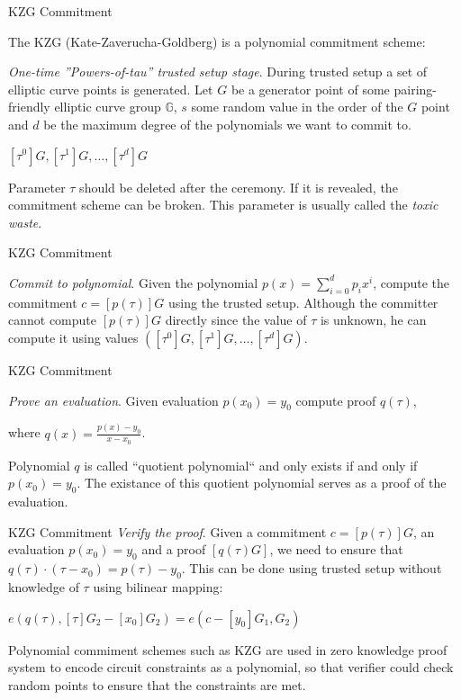 \documentclass{zkdl-presentation-template}
\begin{document}
    \begin{frame}{KZG Commitment}
    
    The KZG (Kate-Zaverucha-Goldberg) is a polynomial commitment scheme:

        \textit{One-time ''Powers-of-tau'' trusted setup stage}. During trusted setup a set of elliptic curve points is generated. Let $G$ be a generator point of some pairing-friendly
        elliptic curve group $\mathbb{G}$, $s$ some random value in the order of the $G$ point and $d$ be the maximum degree of the polynomials we want to commit to.

        \begin{center}
            $[\tau^0]G, [\tau^1]G, \ldots, [\tau^d]G$
        \end{center}

        Parameter $\tau$ should be deleted after the ceremony. If it is revealed, the commitment scheme can be broken. This parameter is usually called the \textit{toxic waste}.
    \end{frame}

    \begin{frame}{KZG Commitment}

        \textit{Commit to polynomial}. Given the polynomial $p(x) = \sum_{i = 0}^{d} p_i x^i$, compute the commitment $c = [p(\tau)]G $ 
        using the trusted setup. Although the committer cannot compute $[p(\tau)]G$ directly since the value of $\tau$ is unknown, he can
        compute it using values $([\tau^0]G, [\tau^1]G, \ldots, [\tau^d]G)$.
    \end{frame}
    
    \begin{frame}{KZG Commitment}
    
        \textit{Prove an evaluation}. Given evaluation $p(x_0) = y_0$ compute proof $q(\tau)$,
    
        where $q(x) = \frac{p(x) - y_0}{x - x_0}$.

        Polynomial $q$ is called ``quotient polynomial`` and only exists if and only if $p(x_0) = y_0$. The existance of this quotient polynomial serves
        as a proof of the evaluation.
    \end{frame}

    \begin{frame}{KZG Commitment}
        \textit{Verify the proof}. Given a commitment $c = [p(\tau)]G$, an evaluation $p(x_0) = y_0$ and a proof $[q(\tau)G]$, we need to
        ensure that $q(\tau) \cdot (\tau - x_0) = p(\tau) - y_0$. This can be done using trusted setup without knowledge of $\tau$ using bilinear mapping:

        \begin{center}
            $e(q(\tau), [\tau]G_2 - [x_0]G_2) = e(c - [y_0]G_1, G_2)$
        \end{center}
        
        Polynomial commiment schemes such as KZG are used in zero knowledge proof system to encode circuit constraints as a polynomial, 
        so that verifier could check random points to ensure that the constraints are met.
    \end{frame}
    
\end{document}
